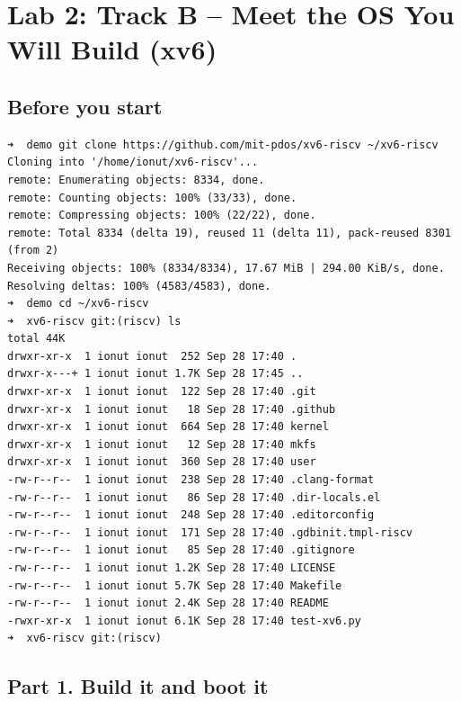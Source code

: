 \documentclass{labreport}
\begin{document}
\newpage
\section{Lab 2: Track B -- Meet the OS You Will Build (xv6)}

\subsection{Before you start}
\begin{lstlisting}[style=bash]
➜  demo git clone https://github.com/mit-pdos/xv6-riscv ~/xv6-riscv
Cloning into '/home/ionut/xv6-riscv'...
remote: Enumerating objects: 8334, done.
remote: Counting objects: 100% (33/33), done.
remote: Compressing objects: 100% (22/22), done.
remote: Total 8334 (delta 19), reused 11 (delta 11), pack-reused 8301 (from 2)
Receiving objects: 100% (8334/8334), 17.67 MiB | 294.00 KiB/s, done.
Resolving deltas: 100% (4583/4583), done.
➜  demo cd ~/xv6-riscv
➜  xv6-riscv git:(riscv) ls
total 44K
drwxr-xr-x  1 ionut ionut  252 Sep 28 17:40 .
drwxr-x---+ 1 ionut ionut 1.7K Sep 28 17:45 ..
drwxr-xr-x  1 ionut ionut  122 Sep 28 17:40 .git
drwxr-xr-x  1 ionut ionut   18 Sep 28 17:40 .github
drwxr-xr-x  1 ionut ionut  664 Sep 28 17:40 kernel
drwxr-xr-x  1 ionut ionut   12 Sep 28 17:40 mkfs
drwxr-xr-x  1 ionut ionut  360 Sep 28 17:40 user
-rw-r--r--  1 ionut ionut  238 Sep 28 17:40 .clang-format
-rw-r--r--  1 ionut ionut   86 Sep 28 17:40 .dir-locals.el
-rw-r--r--  1 ionut ionut  248 Sep 28 17:40 .editorconfig
-rw-r--r--  1 ionut ionut  171 Sep 28 17:40 .gdbinit.tmpl-riscv
-rw-r--r--  1 ionut ionut   85 Sep 28 17:40 .gitignore
-rw-r--r--  1 ionut ionut 1.2K Sep 28 17:40 LICENSE
-rw-r--r--  1 ionut ionut 5.7K Sep 28 17:40 Makefile
-rw-r--r--  1 ionut ionut 2.4K Sep 28 17:40 README
-rwxr-xr-x  1 ionut ionut 6.1K Sep 28 17:40 test-xv6.py
➜  xv6-riscv git:(riscv)
\end{lstlisting}

\subsection{Part 1. Build it and boot it}
\end{document}
